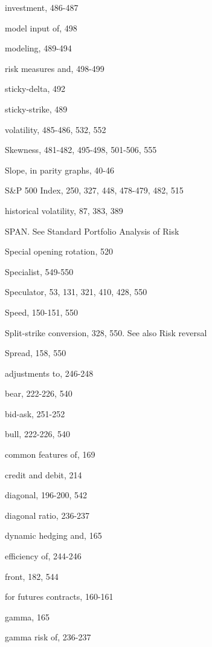 \noindent investment, 486-487\par
\noindent model input of, 498\par
\noindent modeling, 489-494\par
\noindent risk measures and, 498-499\par
\noindent sticky-delta, 492\par
\noindent sticky-strike, 489\par
\noindent volatility, 485-486, 532, 552\par
\noindent Skewness, 481-482, 495-498, 501-506, 555\par
\noindent Slope, in parity graphs, 40-46\par
\noindent S\&P 500 Index, 250, 327, 448, 478-479, 482, 515\par
\noindent historical volatility, 87, 383, 389\par
\noindent SPAN. See Standard Portfolio Analysis of Risk\par
\noindent Special opening rotation, 520\par
\noindent Specialist, 549-550\par
\noindent Speculator, 53, 131, 321, 410, 428, 550\par
\noindent Speed, 150-151, 550\par
Split-strike conversion, 328, 550. See also Risk reversal\par
\noindent Spread, 158, 550\par
\noindent adjustments to, 246-248\par
\noindent bear, 222-226, 540\par
\noindent bid-ask, 251-252\par
\noindent bull, 222-226, 540\par
\noindent common features of, 169\par
\noindent credit and debit, 214\par
\noindent diagonal, 196-200, 542\par
\noindent diagonal ratio, 236-237\par
\noindent dynamic hedging and, 165\par
\noindent efficiency of, 244-246\par
\noindent front, 182, 544\par
\noindent for futures contracts, 160-161\par
\noindent gamma, 165\par
\noindent gamma risk of, 236-237\par

